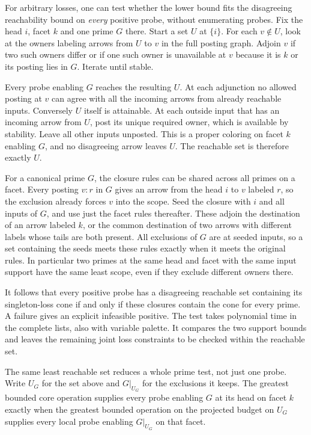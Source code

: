 For arbitrary losses, one can test whether the lower
bound fits the disagreeing reachability bound on
\emph{every} positive probe, without enumerating probes.
Fix the head $i$, facet $k$ and one prime $G$ there.
Start a set $U$ at $\{i\}$. For each $v\notin U$,
look at the owners labeling arrows from $U$ to $v$
in the full posting graph. Adjoin $v$ if two such
owners differ or if one such owner is unavailable
at $v$ because it is $k$ or its posting lies in $G$.
Iterate until stable.

Every probe enabling $G$ reaches the resulting $U$.
At each adjunction no allowed posting at $v$ can agree
with all the incoming arrows from already reachable
inputs. Conversely $U$ itself is attainable. At each
outside input that has an incoming arrow from $U$,
post its unique required owner, which is available
by stability. Leave all other inputs unposted.
This is a proper coloring on facet $k$ enabling $G$,
and no disagreeing arrow leaves $U$. The reachable
set is therefore exactly $U$.

For a canonical prime $G$, the closure rules can be
shared across all primes on a facet. Every posting
$v:r$ in $G$ gives an arrow from the head $i$ to
$v$ labeled $r$, so the exclusion already forces
$v$ into the scope. Seed the closure with $i$ and
all inputs of $G$, and use just the facet rules
thereafter. These adjoin the destination of an
arrow labeled $k$, or the common destination of two
arrows with different labels whose tails are both
present. All exclusions of $G$ are at seeded inputs,
so a set containing the seeds meets these rules
exactly when it meets the original rules. In
particular two primes at the same head and facet with
the same input support have the same least scope,
even if they exclude different owners there.

It follows that every positive probe has a disagreeing
reachable set containing its singleton-loss cone if
and only if these closures contain the cone for every
prime. A failure gives an explicit infeasible positive.
The test takes polynomial time in the complete lists,
also with variable palette. It compares the two support
bounds and leaves the remaining joint loss constraints
to be checked within the reachable set.

The same least reachable set reduces a whole prime
test, not just one probe. Write $U_G$ for the set
above and $G|_{U_G}$ for the exclusions it keeps.
The greatest bounded core operation supplies every
probe enabling $G$ at its head on facet $k$ exactly
when the greatest bounded operation on the projected
budget on $U_G$ supplies every local probe enabling
$G|_{U_G}$ on that facet.

